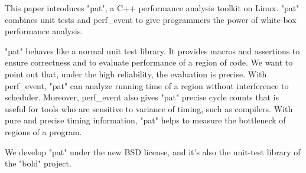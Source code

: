 This paper introduces "pat", a C++ performance analysis toolkit on Linux.
"pat" combines unit tests and perf_event to give programmers the power of white-box performance analysis.

"pat" behaves like a normal unit test library.
It provides macros and assertions to ensure correctness and to evaluate performance of a region of code.
We want to point out that, under the high reliability, the evaluation is precise.
With perf_event, "pat" can analyze running time of a region without interference to scheduler. 
Moreover, perf_event also gives "pat" precise cycle counts that is useful for tools who are sensitive to variance of timing, such as compilers.
With pure and precise timing information, "pat" helps to measure the bottleneck of regions of a program.

We develop "pat" under the new BSD license, and it's also the unit-test library of the "bold" project.
